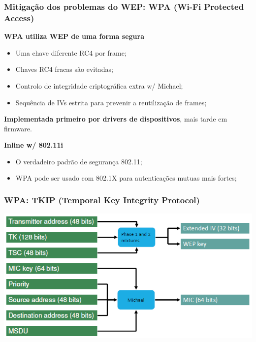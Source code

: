 \documentclass{article}
\begin{document}
\pagebreak

\subsubsection{Mitigação dos problemas do WEP: WPA (Wi-Fi Protected Access)}

\begin{flushleft}
  \textbf{WPA utiliza WEP de uma forma segura}
  \begin{itemize}
    \item Uma chave diferente RC4 por frame;
    \item Chaves RC4 fracas são evitadas;
    \item Controlo de integridade criptográfica extra w/ Michael;
    \item Sequência de IVs estrita para prevenir a reutilização de frames;
  \end{itemize}

  \textbf{Implementada primeiro por drivers de dispositivos}, mais tarde em firmware.

  \vspace{2mm}

  \textbf{Inline w/ 802.11i}
  \begin{itemize}
    \item O verdadeiro padrão de segurança 802.11;
    \item WPA pode ser usado com 802.1X para autenticações mutuas mais fortes;
  \end{itemize}
\end{flushleft}

\subsubsection*{WPA: TKIP (Temporal Key Integrity Protocol)}

\begin{center}
  \includegraphics[scale=0.6]{46}
\end{center}
\end{document}
